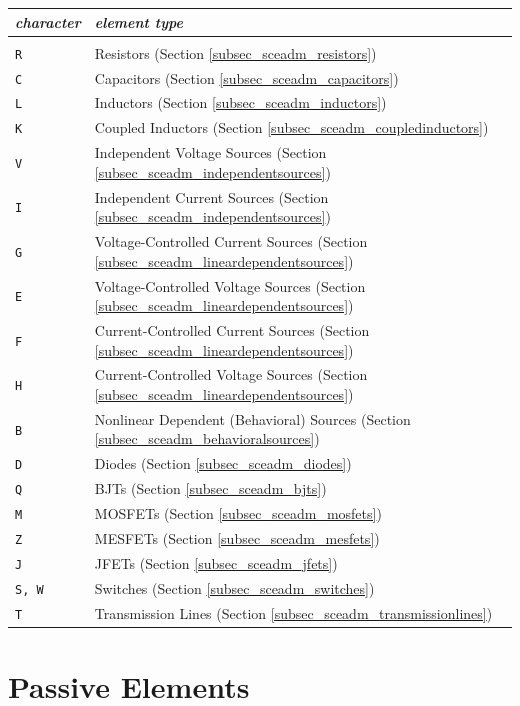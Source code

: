 \begin{tabular}{lp{14cm}}
\textit{character} & \textit{element type}\\ \hline \\ \vspace{-0.8\parskip}
\texttt{R} & Resistors (Section \ref{subsec_sceadm_resistors}) \\
\texttt{C} & Capacitors (Section \ref{subsec_sceadm_capacitors}) \\
\texttt{L} & Inductors (Section \ref{subsec_sceadm_inductors}) \\
\texttt{K} & Coupled Inductors (Section \ref{subsec_sceadm_coupledinductors}) \\
\texttt{V} & Independent Voltage Sources (Section \ref{subsec_sceadm_independentsources}) \\
\texttt{I} & Independent Current Sources (Section \ref{subsec_sceadm_independentsources}) \\
\texttt{G} & Voltage-Controlled Current Sources (Section \ref{subsec_sceadm_lineardependentsources}) \\
\texttt{E} & Voltage-Controlled Voltage Sources (Section \ref{subsec_sceadm_lineardependentsources}) \\
\texttt{F} & Current-Controlled Current Sources (Section \ref{subsec_sceadm_lineardependentsources}) \\
\texttt{H} & Current-Controlled Voltage Sources (Section \ref{subsec_sceadm_lineardependentsources}) \\ 
\texttt{B} & Nonlinear Dependent (Behavioral) Sources (Section \ref{subsec_sceadm_behavioralsources}) \\
\texttt{D} & Diodes (Section \ref{subsec_sceadm_diodes}) \\
\texttt{Q} & BJTs (Section \ref{subsec_sceadm_bjts}) \\
\texttt{M} & MOSFETs (Section \ref{subsec_sceadm_mosfets}) \\
\texttt{Z} & MESFETs (Section \ref{subsec_sceadm_mesfets}) \\
\texttt{J} & JFETs (Section \ref{subsec_sceadm_jfets}) \\
\texttt{S, W} & Switches (Section \ref{subsec_sceadm_switches}) \\
\texttt{T} & Transmission Lines (Section \ref{subsec_sceadm_transmissionlines}) \\

\end{tabular}

\section{Passive Elements}
\label{sec_sceadm_passiveelements}

